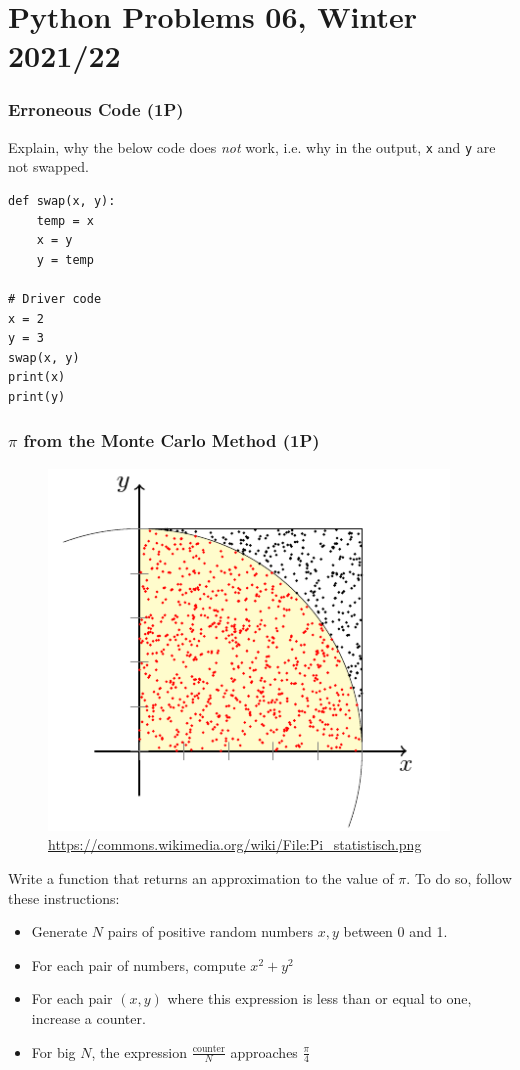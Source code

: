 \documentclass[
	english,
	fontsize=10pt,
	parskip=half,
	titlepage=true,
	DIV=12
]{scrartcl}
\newcommand*{\ie}{i.\;e. }
\begin{document}
\part*{Python Problems 06, Winter 2021/22}
\section{Erroneous Code (1\;P)}
Explain, why the below code does \emph{not} work, \ie why in the output, \texttt{x} and \texttt{y} are not swapped.
\begin{verbatim}
def swap(x, y): 
    temp = x
    x = y
    y = temp
  
# Driver code 
x = 2
y = 3
swap(x, y) 
print(x) 
print(y) 
\end{verbatim}

\section{$\pi$ from the Monte Carlo Method (1\;P)}
\begin{figure}
\vspace{-20pt}
\includegraphics[width=\linewidth]{MCarlo}
\caption{\url{https://commons.wikimedia.org/wiki/File:Pi_statistisch.png}}
\label{fig:MCPI}
\vspace{-50pt}
\end{figure}
%
Write a function that returns an approximation to the value of $\pi$. To do so, follow these instructions:
\begin{itemize}
\item Generate $N$ pairs of positive random numbers $x, y$ between 0 and 1.
\item For each pair of numbers, compute $x^2 + y^2$
\item For each pair $(x, y)$ where this expression is less than or equal to one, increase a counter.
\item For big $N$, the expression $\frac{\text{counter}}{N}$ approaches $\frac{\pi}{4}$
\end{itemize}
\end{document}
